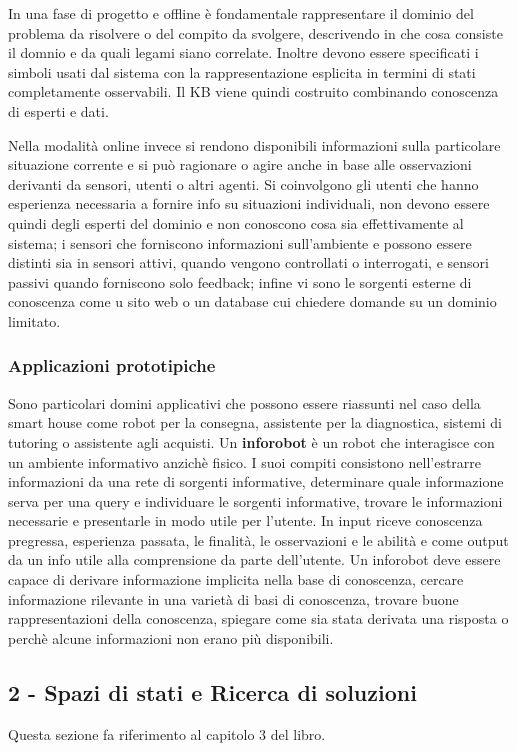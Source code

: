 \documentclass[a4paper]{extarticle}
\begin{document}
In una fase di progetto e offline è fondamentale rappresentare il dominio del problema da risolvere o del compito da svolgere, descrivendo in che cosa consiste il domnio e da quali legami siano correlate. Inoltre devono essere specificati i simboli usati dal sistema con la rappresentazione esplicita in termini di stati completamente osservabili. Il KB viene quindi costruito combinando conoscenza di esperti e dati.

Nella modalità online invece si rendono disponibili informazioni sulla particolare situazione corrente e si può ragionare o agire anche in base alle osservazioni derivanti da sensori, utenti o altri agenti. Si coinvolgono gli utenti che hanno esperienza necessaria a fornire info su situazioni individuali, non devono essere quindi degli esperti del dominio e non conoscono cosa sia effettivamente al sistema; i sensori che forniscono informazioni sull'ambiente e possono essere distinti sia in sensori attivi, quando vengono controllati o interrogati, e sensori passivi quando forniscono solo feedback; infine vi sono le sorgenti esterne di conoscenza come u sito web o un database cui chiedere domande su un dominio limitato.

\subsubsection{Applicazioni prototipiche}

Sono particolari domini applicativi che possono essere riassunti nel caso della smart house come robot per la consegna, assistente per la diagnostica, sistemi di tutoring o assistente agli acquisti. Un \textbf{inforobot} è un robot che interagisce con un ambiente informativo anzichè fisico. I suoi compiti consistono nell'estrarre informazioni da una rete di sorgenti informative, determinare quale informazione serva per una query e individuare le sorgenti informative, trovare le informazioni necessarie e presentarle in modo utile per l'utente. In input riceve conoscenza pregressa, esperienza passata, le finalità, le osservazioni e le abilità e come output da un info utile alla comprensione da parte dell'utente. Un inforobot deve essere capace di derivare informazione implicita nella base di conoscenza, cercare informazione rilevante in una varietà di basi di conoscenza, trovare buone rappresentazioni della conoscenza, spiegare come sia stata derivata una risposta o perchè alcune informazioni non erano più disponibili.
\newpage
\subsection{2 - Spazi di stati e Ricerca di soluzioni}
Questa sezione fa riferimento al capitolo 3 del libro.
\end{document}
